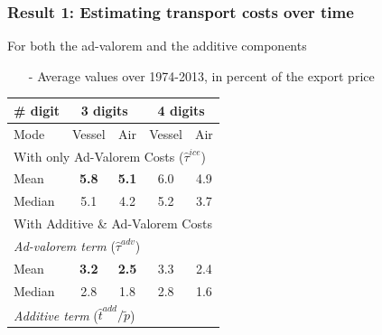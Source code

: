 \documentclass[10 pt,Helvetica, french]{beamer}
\begin{document}
\begin{frame}[label=slide_results_summary]
\frametitle{Result 1: Estimating transport costs over time}
For both the ad-valorem and the additive components \vspace{0.1cm}
\begin{itemize}
\item[-] \footnotesize{Average values over 1974-2013, in percent of the export price \hyperlink{app_results_summary}{}  } \vspace{0.1cm}
\end{itemize}
\begin{table}[htbp]
  \centering
  \scriptsize{
  \begin{center}
    \begin{tabular}{l|cc|cc}
      \hline \hline
    \# digit & \multicolumn{2}{c}{3 digits} & \multicolumn{2}{c}{4 digits} \\ \hline
    Mode  & Vessel & Air & Vessel & Air \\ \hline
    \multicolumn{5}{l}{With only Ad-Valorem Costs ($\widehat{\tau}^{ice}$)}  \\ \hline
    Mean  & \bf{5.8} & \bf{5.1} & 6.0 & 4.9 \\
    Median & 5.1 & 4.2 & 5.2 & 3.7 \\ \hline
    \multicolumn{5}{l}{With Additive \& Ad-Valorem Costs } \\ \hline
   \multicolumn{5}{l}{\textit{Ad-valorem term} ($\widehat{\tau}^{adv}$)}\\ \hline
    Mean  & \bf{3.2} & \bf{2.5} & 3.3 & 2.4 \\
    Median & 2.8 & 1.8 & 2.8 & 1.6 \\ \hline
    \multicolumn{5}{l}{\textit{Additive term }($\widehat{t}^{add}/\widetilde{p}$)} \\ \hline

\end{tabular}
\end{center}}
\end{table}
\end{frame}
\end{document}
